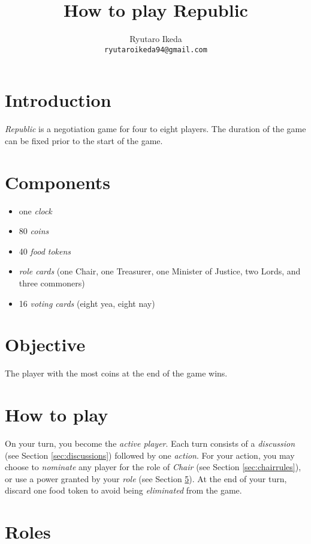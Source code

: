 \documentclass[12pt,a4paper,twocolumn]{article}
\title{How to play Republic}
\author{Ryutaro Ikeda\\
\texttt{ryutaroikeda94@gmail.com}}
\newcommand{\lessspace}
{
\setlength{\itemsep}{0pt}
\setlength{\parskip}{0pt}
\setlength{\parsep}{0pt}
}
\newenvironment{lessitemize}
{
\begin{itemize}
\lessspace
}
{
\end{itemize}
}
\begin{document}
\maketitle
{}

\section{Introduction}

\textit{Republic} is a negotiation game for four to eight players.
The duration of the game can be fixed prior to the start of the game.

\section{Components}

\begin{lessitemize}
\item one \textit{clock}
\item 80 \textit{coins}
\item 40 \textit{food tokens}
\item \textit{role cards} (one Chair, one Treasurer, one Minister of Justice, two Lords, and three commoners)
\item 16 \textit{voting cards} (eight yea, eight nay)
\end{lessitemize}

\section{Objective}

The player with the most coins at the end of the game wins.


\section{How to play}

On your turn, you become the \textit{active player}.
Each turn consists of a \textit{discussion} (see Section \ref{sec:discussions}) followed by one \textit{action}.
For your action, you may choose to \textit{nominate} any player for the role of \textit{Chair} (see Section \ref{sec:chairrules}), or use a power granted by your \textit{role} (see Section \ref{sec:rolerules}).
At the end of your turn, discard one food token to avoid being \textit{eliminated} from the game.

\section{Roles}
\label{sec:rolerules}
\end{document}
